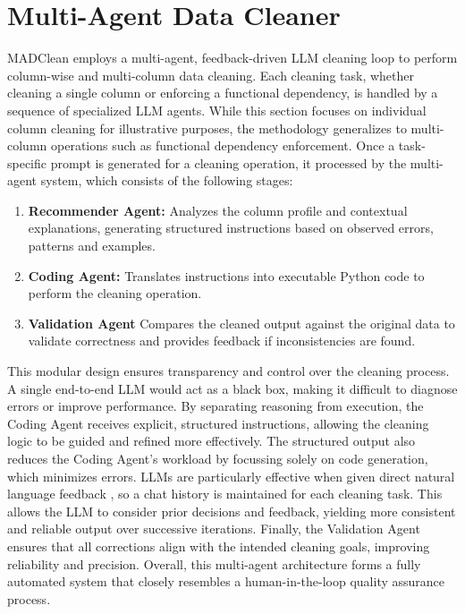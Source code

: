 \section{Multi-Agent Data Cleaner}
MADClean employs a multi-agent, feedback-driven LLM cleaning loop to perform column-wise and multi-column data cleaning. 
Each cleaning task, whether cleaning a single column or enforcing a functional dependency, is handled by a sequence of specialized LLM agents. 
While this section focuses on individual column cleaning for illustrative purposes, the methodology generalizes to multi-column operations such as functional dependency enforcement.
\newline\newline
Once a task-specific prompt is generated for a cleaning operation, it processed by the multi-agent system, which consists of the following stages:
\begin{enumerate}
    \item \textbf{Recommender Agent:} Analyzes the column profile and contextual explanations, generating structured instructions based on observed errors, patterns and examples. 
    \item \textbf{Coding Agent:} Translates instructions into executable Python code to perform the cleaning operation.
    \item \textbf{Validation Agent} Compares the cleaned output against the original data to validate correctness and provides feedback if inconsistencies are found.
\end{enumerate}
This modular design ensures transparency and control over the cleaning process. 
A single end-to-end LLM would act as a black box, making it difficult to diagnose errors or improve performance. 
By separating reasoning from execution, the Coding Agent receives explicit, structured instructions, allowing the cleaning logic to be guided and refined more effectively. 
The structured output also reduces the Coding Agent's workload by focussing solely on code generation, which minimizes errors. 
LLMs are particularly effective when given direct natural language feedback \cite{MINT}, so a chat history is maintained for each cleaning task. 
This allows the LLM to consider prior decisions and feedback, yielding more consistent and reliable output over successive iterations. 
Finally, the Validation Agent ensures that all corrections align with the intended cleaning goals, improving reliability and precision. 
Overall, this multi-agent architecture forms a fully automated system that closely resembles a human-in-the-loop quality assurance process.

